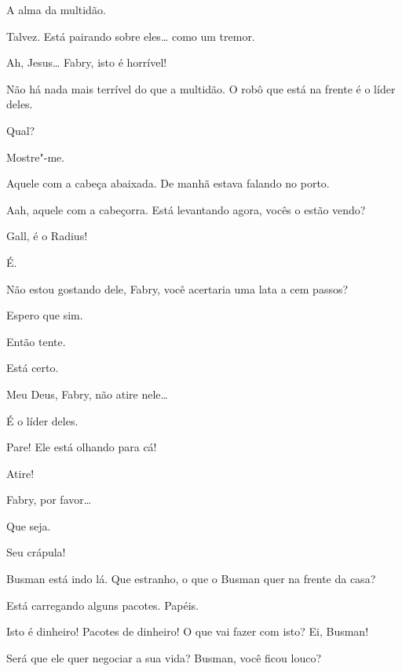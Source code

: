  A alma da multidão.

 Talvez. Está pairando sobre eles\ldots{} como um \mbox{tremor}.

  Ah, Jesus\ldots{} Fabry, isto é horrível!

 Não há nada mais terrível do que a multidão. O robô que está na frente é
o líder deles.

 Qual?

  Mostre"-me.

 Aquele com a cabeça abaixada. De manhã estava falando no porto.

 Aah, aquele com a cabeçorra. Está levantando agora, vocês o estão
vendo?

 Gall, é o Radius!

  É.

  Não estou gostando dele, Fabry, você
acertaria uma lata a cem passos?

 Espero que sim.

 Então tente.

 Está certo. 

 Meu Deus, Fabry, não atire nele\ldots{}

 É o líder deles.

 Pare! Ele está olhando para cá!

 Atire!

 Fabry, por favor\ldots{}

  Que seja.

  Seu crápula!


  Busman está indo lá. Que estranho,
o que o Busman quer na frente da casa?

  Está carregando alguns
pacotes. Papéis.

 Isto é dinheiro! Pacotes de dinheiro! O que vai fazer com isto? Ei,
Busman!

 Será que ele quer negociar a sua vida?  Busman, você
ficou louco?

